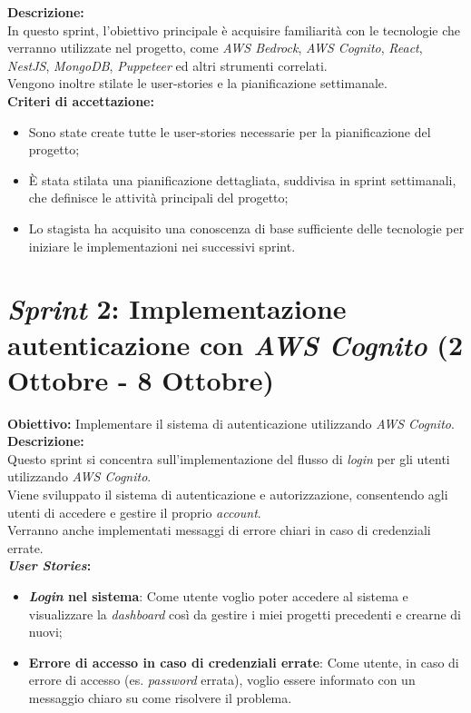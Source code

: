 \noindent \textbf{Descrizione:}\\  
\noindent In questo \gls{sprint}, l'obiettivo principale è acquisire familiarità con le tecnologie che verranno utilizzate nel progetto, come \textit{AWS Bedrock}, \textit{AWS Cognito}, \textit{React}, \textit{NestJS}, \textit{MongoDB}, \textit{Puppeteer} ed altri strumenti correlati.\\
Vengono inoltre stilate le \gls{user-stories} e la pianificazione settimanale.\\

\noindent \textbf{Criteri di accettazione:}  
\begin{itemize}
    \item Sono state create tutte le \gls{user-stories} necessarie per la pianificazione del progetto;
    \item È stata stilata una pianificazione dettagliata, suddivisa in \gls{sprint} settimanali, che definisce le attività principali del progetto;
    \item Lo stagista ha acquisito una conoscenza di base sufficiente delle tecnologie per iniziare le implementazioni nei successivi \gls{sprint}.
\end{itemize}
\section*{\textit{Sprint} 2: Implementazione autenticazione con \textit{AWS Cognito} (2 Ottobre - 8 Ottobre)}
\textbf{Obiettivo:} Implementare il sistema di autenticazione utilizzando \textit{AWS Cognito}.\\  

\noindent \textbf{Descrizione:}\\  
\noindent Questo \gls{sprint} si concentra sull'implementazione del flusso di \textit{login} per gli utenti utilizzando \textit{AWS Cognito}. \\
Viene sviluppato il sistema di autenticazione e autorizzazione, consentendo agli utenti di accedere e gestire il proprio \textit{account}. \\
Verranno anche implementati messaggi di errore chiari in caso di credenziali errate.\\

\noindent \textbf{\textit{User Stories}:}  
\begin{itemize}
    \item \textbf{\textit{Login} nel sistema}: Come utente voglio poter accedere al sistema e visualizzare la \textit{dashboard} così da gestire i miei progetti precedenti e crearne di nuovi;
    \item \textbf{Errore di accesso in caso di credenziali errate}: Come utente, in caso di errore di accesso (es. \textit{password} errata), voglio essere informato con un messaggio chiaro su come risolvere il problema.
\end{itemize}

